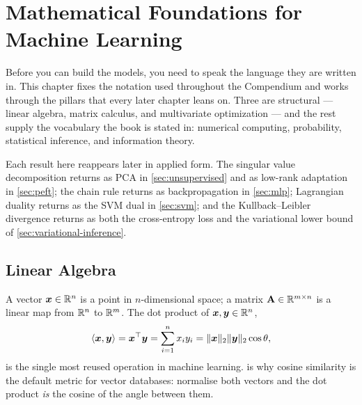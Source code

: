 %
\chapter{Mathematical Foundations for Machine Learning}
\label{ch:math-foundations}

Before you can build the models, you need to speak the language they are written
in. This chapter fixes the notation used throughout the Compendium and works
through the pillars that every later chapter leans on. Three are structural ---
linear algebra, matrix calculus, and multivariate optimization --- and the rest
supply the vocabulary the book is stated in: numerical computing, probability,
statistical inference, and information theory.

Each result here reappears later in applied form. The singular value
decomposition returns as PCA in \cref{sec:unsupervised} and as low-rank
adaptation in \cref{sec:peft}; the chain rule returns as backpropagation in
\cref{sec:mlp}; Lagrangian duality returns as the SVM dual in \cref{sec:svm};
and the Kullback--Leibler divergence returns as both the cross-entropy loss and
the variational lower bound of \cref{sec:variational-inference}.

\section{Linear Algebra}
\label{sec:linear-algebra}

A vector $\vect{x} \in \R^{n}$ is a point in $n$-dimensional space; a matrix
$\mat{A} \in \R^{m \times n}$ is a linear map from $\R^{n}$ to $\R^{m}$. The
dot product of $\vect{x}, \vect{y} \in \R^{n}$,
%
\begin{equation}
    \inner*{\vect{x}, \vect{y}} = \vect{x}\T \vect{y}
        = \sum_{i=1}^{n} x_i y_i
        = \norm{\vect{x}}_2 \norm{\vect{y}}_2 \cos\theta ,
    \label{eq:dot-product}
\end{equation}
%
is the single most reused operation in machine learning. 
is why cosine similarity is the default metric for vector databases: normalise
both vectors and the dot product \emph{is} the cosine of the angle between them.


